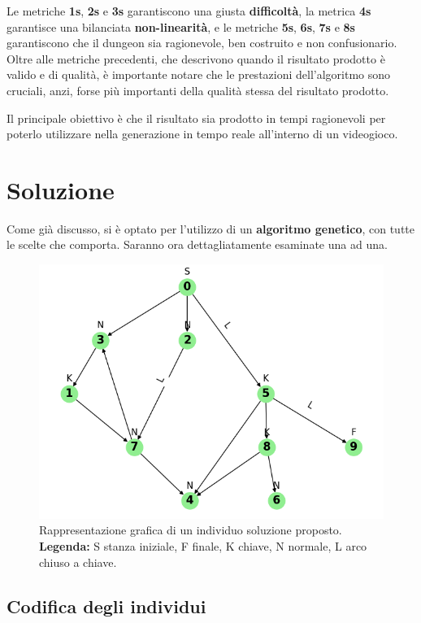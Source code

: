 \documentclass[12pt,titlepage]{article}
\begin{document}
\noindent Le metriche \textbf{1s}, \textbf{2s} e \textbf{3s} garantiscono una giusta \textbf{difficoltà}, la metrica \textbf{4s} garantisce una bilanciata \textbf{non-linearità}, e le metriche \textbf{5s}, \textbf{6s}, \textbf{7s} e \textbf{8s} garantiscono che il dungeon sia ragionevole, ben costruito e non confusionario.\\

\noindent Oltre alle metriche precedenti, che descrivono quando il risultato prodotto è valido e di qualità, è importante notare che le prestazioni dell'algoritmo sono cruciali, anzi, forse più importanti della qualità stessa del risultato prodotto.

Il principale obiettivo è che il risultato sia prodotto in tempi ragionevoli per poterlo utilizzare nella generazione in tempo reale all'interno di un videogioco.

\newpage

\section{Soluzione}

Come già discusso, si è optato per l'utilizzo di un \textbf{algoritmo genetico}, con tutte le scelte che comporta. Saranno ora dettagliatamente esaminate una ad una.

\begin{figure}[h]
    \setlength{\belowcaptionskip}{-5pt}
    \centering
    \includegraphics[width=0.65\linewidth]{assets/solution-example.png}
    \caption{Rappresentazione grafica di un individuo soluzione proposto.\\\textbf{Legenda:} S stanza iniziale, F finale, K chiave, N normale, L arco chiuso a chiave.}
\end{figure}

\subsection {Codifica degli individui}
\end{document}
